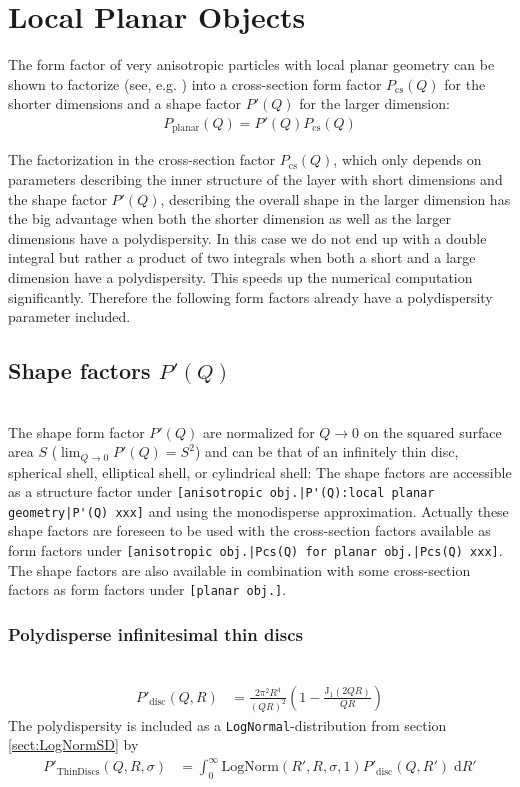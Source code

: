 \section{Local Planar Objects}
The form factor of very anisotropic particles with local planar
geometry can be shown to factorize (see, e.g. \cite{Porod1948})
into a cross-section form factor $P_\text{cs}(Q)$ for the shorter
dimensions and a shape factor $P'(Q)$ for the larger dimension:
\begin{align}
P_\text{planar}(Q) = P'(Q) P_\text{cs}(Q)
\end{align}

The factorization in the cross-section factor $P_\text{cs}(Q)$, which only depends on parameters describing the
inner structure of the layer with short dimensions and the shape factor $P'(Q)$, describing the overall shape in the larger dimension
has the big advantage when both the shorter dimension as well as the larger dimensions have a polydispersity.
In this case we do not end up with a double integral but rather a product of two integrals when both a short and a large
dimension have a polydispersity. This speeds up the numerical computation significantly. Therefore the following form factors
already have a polydispersity parameter included.

\subsection{Shape factors $P'(Q)$}
\label{subsubsect:ShapeFactor}
\hspace{1pt} \\
The shape form factor $P'(Q)$ are normalized for $Q\rightarrow 0$ on the squared surface area
$S$ ($\lim_{Q\rightarrow 0} P'(Q) = S^2$) and can be that of an infinitely thin disc,
spherical shell, elliptical shell, or cylindrical shell:
The shape factors are  accessible as a structure factor under \verb"[anisotropic obj.|P'(Q):local planar geometry|P'(Q) xxx]"
and using the monodisperse approximation. Actually these shape factors are foreseen to be used with the cross-section factors
available as form factors under \verb"[anisotropic obj.|Pcs(Q) for planar obj.|Pcs(Q) xxx]".
The shape factors are also available in combination with some cross-section factors as form factors
under \verb"[planar obj.]".
~\\

\subsubsection{Polydisperse infinitesimal thin discs}
\label{subsubsect:ThinDisc}
\hspace{1pt} \\
\begin{align}
P'_\text{disc}(Q,R) &=\frac{2\pi^2R^4}{(QR)^2} \left(1-\frac{\text{J}_1(2QR)}{QR}\right)
\end{align}
The polydispersity is included as a \texttt{LogNormal}-distribution from section \ref{sect:LogNormSD} by
\begin{align}
P'_\text{ThinDiscs}(Q,R,\sigma) &= \int_0^\infty \mathrm{LogNorm}(R',R,\sigma,1) P'_\text{disc}(Q,R') \; \mathrm{d}R'
\end{align}

